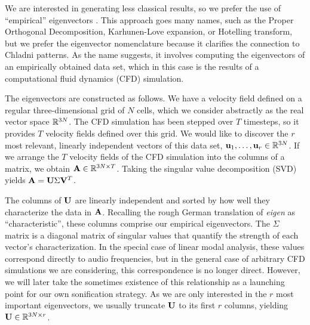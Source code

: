 \documentclass[11pt]{article}
\begin{document}

We are interested in generating less classical results, so we prefer the use of ``empirical'' eigenvectors \cite{Ryckelynck2005}. This approach goes many names, such as the Proper Orthogonal Decomposition, Karhunen-Love expansion, or Hotelling transform, but we prefer the eigenvector nomenclature because it clarifies the connection to Chladni patterns. As the name suggests, it involves computing the eigenvectors of an empirically obtained data set, which in this case is the results of a computational fluid dynamics (CFD) simulation.

The eigenvectors are constructed as follows. We have a velocity field defined on a regular three-dimensional grid of $N$ cells, which we consider abstractly as the real vector space $\mathbb{R}^{3N}$. The CFD simulation has been stepped over $T$ timesteps, so it provides $T$ velocity fields defined over this grid. We would like to discover the $r$ most relevant, linearly independent vectors of this data set, $\mathbf{u}_1, \ldots, \mathbf{u}_r \in \mathbb{R}^{3N}$. If we arrange the $T$ velocity fields of the CFD simulation into the columns of a matrix, we obtain $\mathbf{A} \in \mathbb{R}^{3N \times T}$. Taking the singular value decomposition (SVD) yields $\mathbf{A} = \mathbf{U} \Sigma \mathbf{V}^T$.

The columns of $\mathbf{U}$ are linearly independent and sorted by how well they characterize the data in $\mathbf{A}$. Recalling the rough German translation of {\em eigen} as ``characteristic'', these columns comprise our empirical eigenvectors. The $\Sigma$ matrix is a diagonal matrix of singular values that quantify the strength of each vector's characterization. In the special case of linear modal analysis, these values correspond directly to audio frequencies, but in the general case of arbitrary CFD simulations we are considering, this correspondence is no longer direct. However, we will later take the sometimes existence of this relationship as a launching point for our own sonification strategy. As we are only interested in the $r$ most important eigenvectors, we usually truncate $\mathbf{U}$ to its first $r$ columns, yielding $\mathbf{U} \in \mathbb{R}^{3N \times r}$.
\end{document}
